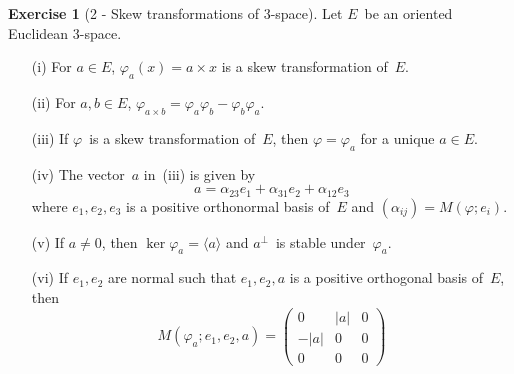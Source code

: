 \documentclass[letterpaper,12pt]{article}
\newcommand{\cross}{\times}
\newcommand{\gen}[1]{\langle#1\rangle}
\newcommand{\oc}[1]{#1^{\perp}}
\newcommand{\norm}[1]{|#1|}
\theoremstyle{definition}
\newtheorem*{exer}{Exercise}
\theoremstyle{remark}
\begin{document}
\begin{exer}[2 - Skew transformations of 3-space]
Let \(E\)~be an oriented Euclidean 3-space.
\begin{enumerate}
\item[(i)] For \(a\in E\), \(\varphi_a(x)=a\cross x\) is a skew transformation of~\(E\).
\item[(ii)] For \(a,b\in E\), \(\varphi_{a\cross b}=\varphi_a\varphi_b-\varphi_b\varphi_a\).
\item[(iii)] If \(\varphi\)~is a skew transformation of~\(E\), then \(\varphi=\varphi_a\) for a unique \(a\in E\).
\item[(iv)] The vector~\(a\) in~(iii) is given by
\[a=\alpha_{23}e_1+\alpha_{31}e_2+\alpha_{12}e_3\]
where \(e_1,e_2,e_3\) is a positive orthonormal basis of~\(E\) and \((\alpha_{ij})=M(\varphi;e_i)\).
\item[(v)] If \(a\ne 0\), then \(\ker\varphi_a=\gen{a}\) and \(\oc{a}\)~is stable under~\(\varphi_a\).
\item[(vi)] If \(e_1,e_2\) are normal such that \(e_1,e_2,a\) is a positive orthogonal basis of~\(E\), then
\[M(\varphi_a;e_1,e_2,a)=\begin{pmatrix}
0&\norm{a}&0\\
-\norm{a}&0&0\\
0&0&0
\end{pmatrix}\]
\end{enumerate}
\end{exer}
\end{document}
